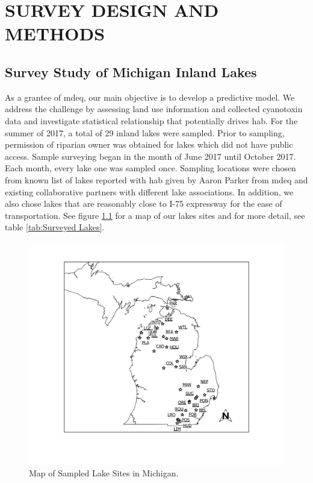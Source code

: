 \chapter{SURVEY DESIGN AND METHODS}
\section{Survey Study of Michigan Inland Lakes} 
As a grantee of \gls{mdeq}, our main objective is to develop a predictive model. We address the challenge by assessing land use information and collected cyanotoxin data and investigate statistical relationship that potentially drives \gls{hab}. For the summer of 2017, a total of 29 inland lakes were sampled. Prior to sampling, permission of riparian owner was obtained for lakes which did not have public access. Sample surveying began in the month of June 2017 until October 2017. Each month, every lake one was sampled once. Sampling locations were chosen from known list of lakes reported with \gls{hab} given by Aaron Parker from \gls{mdeq} and existing collaborative partners with different lake associations. In addition, we also chose lakes that are reasonably close to I-75 expressway for the ease of transportation. See figure \ref{fig:overview} for a map of our lakes sites and for more detail, see table \ref{tab:Surveyed Lakes}.


\begin{figure}[!hp]
\includegraphics[width=\textwidth]{figures/Overview}
\caption{Map of Sampled Lake Sites in Michigan.}
\label{fig:overview}
\end{figure}


